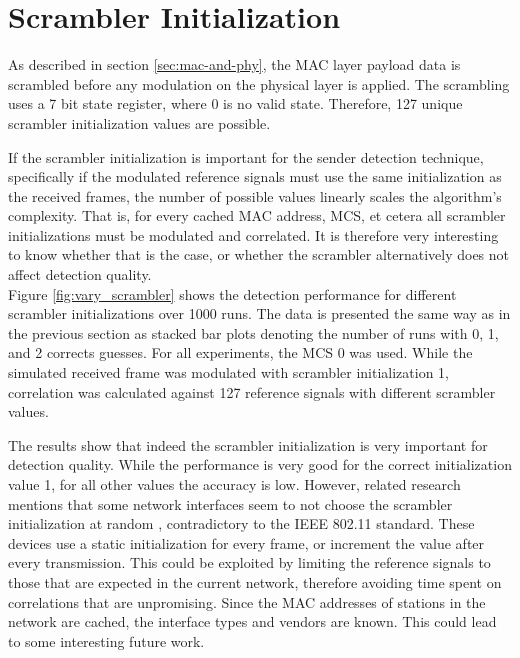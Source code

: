 
\section{Scrambler Initialization}\label{sec:ex-scrambler}

As described in section \ref{sec:mac-and-phy}, the \gls{MAC} layer payload data is scrambled before any modulation on the physical layer is applied. The scrambling uses a 7 bit state register, where 0 is no valid state. Therefore, 127 unique scrambler initialization values are possible.

If the scrambler initialization is important for the sender detection technique, specifically if the modulated reference signals must use the same initialization as the received frames, the number of possible values linearly scales the algorithm's complexity. That is, for every cached \gls{MAC} address, \gls{MCS}, et cetera all scrambler initializations must be modulated and correlated. It is therefore very interesting to know whether that is the case, or whether the scrambler alternatively does not affect detection quality.\\

Figure \ref{fig:vary_scrambler} shows the detection performance for different scrambler initializations over 1000 runs. The data is presented the same way as in the previous section as stacked bar plots denoting the number of runs with 0, 1, and 2 corrects guesses. For all experiments, the \gls{MCS} 0 was used. While the simulated received frame was modulated with scrambler initialization 1, correlation was calculated against 127 reference signals with different scrambler values.

The results show that indeed the scrambler initialization is very important for detection quality. While the performance is very good for the correct initialization value 1, for all other values the accuracy is low. However, related research mentions that some network interfaces seem to not choose the scrambler initialization at random \cite{noubir2016}, contradictory to the IEEE 802.11 standard. These devices use a static initialization for every frame, or increment the value after every transmission. This could be exploited by limiting the reference signals to those that are expected in the current network, therefore avoiding time spent on correlations that are unpromising. Since the \gls{MAC} addresses of stations in the network are cached, the interface types and vendors are known. This could lead to some interesting future work.

